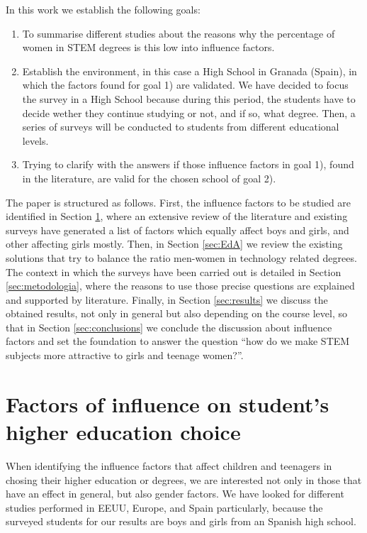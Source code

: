 \documentclass[journal,transmag]{IEEEtran}
\begin{document}
In this work we establish the following goals:
\begin{enumerate}
	\item To summarise different studies about the reasons why the percentage of women in STEM degrees is this low into influence factors.
	\item Establish the environment, in this case a High School in Granada (Spain), in which the factors found for goal 1) are validated. We have decided to focus the survey in a High School because during this period, the students have to decide wether they continue studying or not, and if so, what degree. Then, a series of surveys will be conducted to students from different educational levels.
	\item Trying to clarify with the answers if those influence factors in goal 1), found in the literature, are valid for the chosen school of goal 2).
\end{enumerate}

The paper is structured as follows. First, the influence factors to be studied are identified in Section \ref{sec:factores}, where an extensive review of the literature and existing surveys have generated a list of factors which equally affect boys and girls, and other affecting girls mostly. Then, in Section \ref{sec:EdA} we review the existing solutions that try to balance the ratio men-women in technology related degrees. The context in which the surveys have been carried out is detailed in Section \ref{sec:metodologia}, where the reasons to use those precise questions are explained and supported by literature. Finally, in Section \ref{sec:results} we discuss the obtained results, not only in general but also depending on the course level, so that in Section \ref{sec:conclusions} we conclude the discussion about influence factors and set the foundation to answer the question ``how do we make STEM subjects more attractive to girls and teenage women?''.

\section{Factors of influence on student's higher education choice}
\label{sec:factores}

When identifying the influence factors that affect children and teenagers in chosing their higher education or degrees, we are interested not only in those that have an effect in general, but also gender factors. We have looked for different studies performed in EEUU, Europe, and Spain particularly, because the surveyed students for our results are boys and girls from an Spanish high school.
\end{document}

